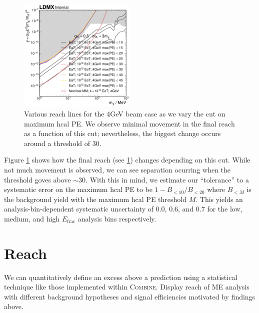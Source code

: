 \begin{figure}
  \centering
  \includegraphics[width=0.5\textwidth]{figures/ldmx/analysis/systematics/max-pe-scan-4gev.pdf}
  \caption{Various reach lines for the 4GeV beam case as we vary the cut on
  maximum \ac{hcal} PE. We observe minimal movement in the final reach as a function
  of this cut; nevertheless, the biggest change occurs around a threshold of 30.}
  \label{fig:4gev-max-pe-scan}
\end{figure}

Figure \ref{fig:4gev-max-pe-scan} shows how the final reach (see \cref{sec:ldmx:analysis:reach})
changes depending on this cut.
While not much movement is observed, we can see separation ocurring when the threshold
goves above $\sim 30$.
With this in mind, we estimate our ``tolerance'' to a systematic error on the maximum
\ac{hcal} PE to be $1 - B_{< 10}/B_{< 20}$ where $B_{< M}$ is the background yield
with the maximum \ac{hcal} PE threshold $M$.
This yields an analysis-bin-dependent systematic uncertainty of $0.0$, $0.6$, and $0.7$
for the low, medium, and high $E_\text{frac}$ analysis bins respectively.

\section{Reach}
\label{sec:ldmx:analysis:reach}
We can quantitatively define an excess above a prediction using a statistical technique like
those implemented within \textsc{Combine}.
Display reach of ME analysis with different background hypotheses and signal efficiencies motivated
by findings above.

